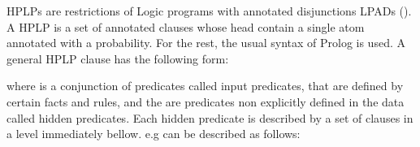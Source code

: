 \documentclass[letterpaper,10pt,english]{sphinxmanual}
\begin{document}
HPLPs are restrictions of Logic programs with annotated disjunctions LPADs (\label{\detokenize{index:id3}}{\hyperref[\detokenize{index:venver03-tr}]{\sphinxcrossref{{[}VV03{]}}}}\label{\detokenize{index:id4}}{\hyperref[\detokenize{index:venver04-iclp04-ic}]{\sphinxcrossref{{[}VVB04{]}}}}). A HPLP is a set of annotated clauses whose head contain a single atom annotated with a probability. For the rest, the usual syntax of Prolog is used.
A general HPLP clause has the following form:

%
\begin{sphinxVerbatim}[commandchars=\\\{\}]
  
\end{sphinxVerbatim}

where  is a conjunction of predicates called input predicates, that are defined by certain facts and rules, and the  are predicates non explicitly defined in the data called hidden predicates. Each hidden predicate is described by a set of clauses in a level immediately bellow. e.g  can be described as follows:

%
\begin{sphinxVerbatim}[commandchars=\\\{\}]
  
  

  
\end{sphinxVerbatim}
\end{document}
